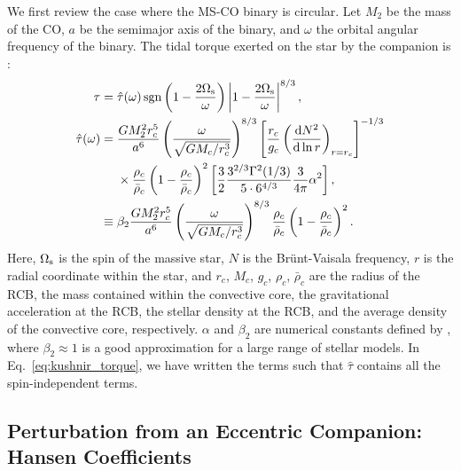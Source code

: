 \documentclass[
        fleqn,
        usenatbib,
    ]{mnras}
\newcommand*{\rd}[2]{\frac{\mathrm{d}#1}{\mathrm{d}#2}}
\newcommand*{\abs}[1]{\left|#1\right|}
\newcommand*{\p}[1]{\left(#1\right)}
\newcommand*{\s}[1]{\left[#1\right]}
\DeclareMathOperator*{\sgn}{sgn}
\begin{document}
We first review the case where the MS-CO binary is circular. Let $M_2$ be the
mass of the CO, $a$ be the semimajor axis of the binary, and $\omega$ the
orbital angular frequency of the binary. The tidal torque exerted on the star by
the companion is \citep{kushnir}:
\begin{align}
    \tau ={}& \hat{\tau}(\omega) \sgn\p{1 - \frac{2\Omega_{\rm s}}{\omega}}
        \abs{1 - \frac{2\Omega_{\rm s}}{\omega}}^{8/3}
            \label{eq:kushnir_torque},\\
    \hat{\tau}(\omega) ={}& \frac{GM_2^2r_c^5}{a^6}
        \p{\frac{\omega}{\sqrt{GM_c/r_c^3}}}^{8/3}
        \s{\frac{r_c}{g_c}\p{\rd{N^2}{\ln r}}_{r = r_c}}^{-1/3}\nonumber\\
            &\times \frac{\rho_c}{\bar{\rho}_c}
                \p{1 - \frac{\rho_c}{\bar{\rho}_c}}^2
                \s{\frac{3}{2}\frac{3^{2/3}\Gamma^2(1/3)}{5 \cdot
                6^{4/3}} \frac{3}{4\pi}\alpha^2},\nonumber\\
        \equiv{}& \beta_2\frac{GM_2^2r_c^5}{a^6}
            \p{\frac{\omega}{\sqrt{GM_c/r_c^3}}}^{8/3}
            \frac{\rho_c}{\bar{\rho}_c} \p{1 - \frac{\rho_c}{\bar{\rho}_c}}^2.
\end{align}
Here, $\Omega_{\rm s}$ is the spin of the massive star, $N$ is the Br\"unt-Vaisala
frequency, $r$ is the radial coordinate within the star, and $r_c$, $M_c$,
$g_c$, $\rho_c$, $\bar{\rho}_c$ are the radius of the RCB, the mass contained
within the convective core, the gravitational acceleration at the RCB, the
stellar density at the RCB, and the average density of the convective core,
respectively. $\alpha$ and $\beta_2$ are numerical constants defined by
\citet{kushnir}, where $\beta_2 \approx 1$ is a good approximation for a large
range of stellar models. In Eq.~\eqref{eq:kushnir_torque}, we have written the
terms such that $\hat{\tau}$ contains all the spin-independent terms.

\subsection{Perturbation from an Eccentric Companion: Hansen Coefficients}
\end{document}
